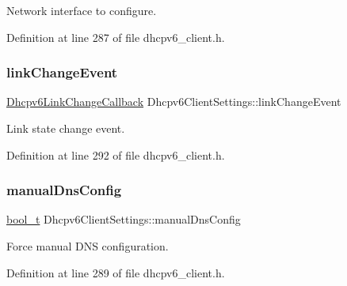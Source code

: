 Network interface to configure. 



Definition at line 287 of file dhcpv6\+\_\+client.\+h.

\mbox{\label{structDhcpv6ClientSettings_a89a8117f9bc78b5beeddca6fc6711ac5}} 
\subsubsection{\texorpdfstring{link\+Change\+Event}{linkChangeEvent}}
{\footnotesize\ttfamily \hyperlink{dhcpv6__client_8h_ae518d21ffd3e2e6bcd552774d398dc7d}{Dhcpv6\+Link\+Change\+Callback} Dhcpv6\+Client\+Settings\+::link\+Change\+Event}



Link state change event. 



Definition at line 292 of file dhcpv6\+\_\+client.\+h.

\mbox{\label{structDhcpv6ClientSettings_a12c720ce782bb7124c146e8b5bf19cca}} 
\subsubsection{\texorpdfstring{manual\+Dns\+Config}{manualDnsConfig}}
{\footnotesize\ttfamily \hyperlink{compiler__port_8h_a812d16e5494522586b3784e55d479912}{bool\+\_\+t} Dhcpv6\+Client\+Settings\+::manual\+Dns\+Config}



Force manual D\+NS configuration. 



Definition at line 289 of file dhcpv6\+\_\+client.\+h.

\mbox{\label{structDhcpv6ClientSettings_af936a8d0ccae32e933868a92b3a58768}} 
